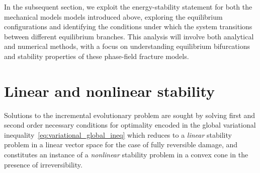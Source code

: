 

In the subsequent section, we exploit the energy-stability statement for both the mechanical models models introduced above, exploring the equilibrium configurations and identifying the conditions under which the system transitions between different equilibrium branches. 
This analysis will involve both analytical and numerical methods, with a focus on understanding equilibrium bifurcations and stability properties of these phase-field fracture models.






% 

\section{Linear and nonlinear stability}

Solutions to the incremental evolutionary problem are sought by solving first and second order necessary conditions for optimality encoded in the global variational inequality~\eqref{eq:variational_global_ineq} which reduces to a \emph{linear} stability problem in a linear vector space for the case of fully reversible damage, and constitutes an instance of a \emph{nonlinear} stability problem in a convex cone in the presence of irreversibility.

